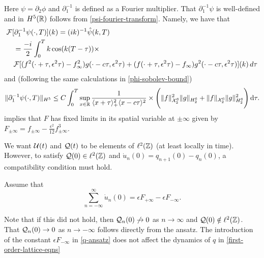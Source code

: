 Here \(\psi = \partial_2 \phi\) and \(\partial_1^{-1}\) is defined as a Fourier multiplier. That \(\partial_1^{-1}\psi\) is well-defined and in \(H^5(\mathbb{R})\) follows from \cref{psi-fourier-transform}. Namely, we have that 
\begin{equation}
\begin{aligned}
	&\mathcal{F}[\partial_1^{-1} \psi(\cdot, T)](k) = (ik)^{-1} \hat\psi(k,T) \\
	&\quad = \frac{-i} 2 \int_0^T k \cos(k(T-\tau)) \times \\ &\quad \mathcal{F}[(f^2(\cdot+\tau,\epsilon^2\tau)-f_\infty^2)g(\cdot-c\tau,\epsilon^2\tau) +(f(\cdot+\tau,\epsilon^2\tau)-f_\infty)g^2(\cdot-c\tau,\epsilon^2\tau)](k) \, d\tau
\end{aligned}
\end{equation}
and (following the same calculations in \cref{phi-sobolev-bound}) 
\begin{equation}
	\| \partial_1^{-1}\psi(\cdot,T) \|_{H^5} \leq C \int_0^T \sup_{x\in\mathbb{R}} \frac 1 {\langle x + \tau\rangle_+^2 \langle x - c\tau\rangle^2} \times \Bigg( \|f\|^2_{\mathcal X^{6}_{2}} \| g \|_{H^{6}_2} + \|f\|_{\mathcal X^{6}_{2}} \| g \|^2_{H^{6}_2} \Bigg) \, \mathrm d \tau. 
\end{equation} implies that \(F\) has fixed limits in its spatial variable at \(\pm \infty\) given by \(F_{\pm\infty} = f_{\pm\infty} -\frac{\epsilon^2}{12} f^3_{\pm\infty}\).

We want \(\mathcal{U}(t)\) and \(\mathcal{Q}(t)\) to be elements of \(\ell^2(\mathbb{Z})\) (at least locally in time). However, to satisfy \(\mathcal{Q}(0)\in\ell^2(\mathbb{Z})\) and \(\dot u_n(0) = q_{n+1}(0) - q_n(0)\), a compatibility condition must hold.
\begin{assum}\label{assumption-2}
	Assume that \[\sum_{n=-\infty}^\infty \dot u_n(0) = \epsilon F_{+\infty} - \epsilon F_{-\infty}.\]
\end{assum}
Note that if this did not hold, then \(\mathcal{Q}_n(0)\not\to 0\) as \(n\to\infty\) and \(\mathcal{Q}(0)\notin \ell^2(\mathbb{Z})\). That \(\mathcal{Q}_n(0) \to 0\) as \(n\to-\infty\) follows directly from the ansatz. The introduction of the constant \(\epsilon F_{-\infty}\) in \cref{q-ansatz} does not affect the dynamics of \(q\) in \cref{first-order-lattice-eqns}

